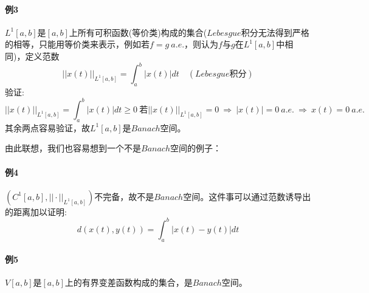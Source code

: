 \paragraph*{例3}$L^1[a,b]$是$[a,b]$上所有可积函数(等价类)构成的集合($Lebesgue$积分无法得到严格的相等，只能用等价类来表示，例如若$f=g \ a.e.$，则认为$f$与$g$在$L^1[a,b]$中相同)，定义范数
\[||x(t)||_{L^1[a,b]}=\int_a^b|x(t)|dt \quad (Lebesgue\text{积分})\]
验证:
\[||x(t)||_{L^1[a,b]}=\int_a^b|x(t)|dt \geq 0 \ \text{若}||x(t)||_{L^1[a,b]}=0 \ \Rightarrow \ |x(t)|=0 \ a.e. \ \Rightarrow \ x(t)=0 \ a.e.\]
其余两点容易验证，故$L^1[a,b]$是$Banach$空间。

由此联想，我们也容易想到一个不是$Banach$空间的例子：
\paragraph*{例4}$(C^1[a,b],||\cdot||_{L^1[a,b]})$不完备，故不是$Banach$空间。这件事可以通过范数诱导出的距离加以证明:
\[d(x(t),y(t))=\int_a^b|x(t)-y(t)|dt\]

\paragraph*{例5}$V[a,b]$是$[a,b]$上的有界变差函数构成的集合，是$Banach$空间。

